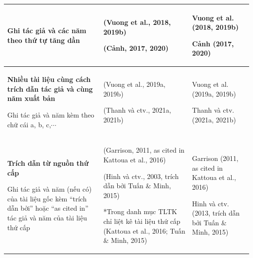 \documentclass[a4paper,oneside]{../../styles/thesis}
\begin{document}
\begin{table}
\begin{tabular}{|l|l|l|}
Ghi tác giả và các năm theo thứ tự tăng dần
    & (Vuong et al., 2018, 2019b)

(Cảnh, 2017, 2020)
 & Vuong et al. (2018, 2019b)

Cảnh (2017, 2020)
 \\
         \hline
  \textbf{Nhiều tài liệu cùng cách trích dẫn tác giả và cùng năm xuất bản}
  
Ghi tác giả và năm kèm theo chữ cái a, b, c,$\cdots$ & (Vuong et al., 2019a, 2019b)

(Thanh và ctv., 2021a, 2021b)
 & Vuong et al. (2019a, 2019b)

Thanh và ctv. (2021a, 2021b)
\\
         \hline
      \textbf{Trích dẫn từ nguồn thứ cấp}
      
Ghi tác giả và năm (nếu có) của tài liệu gốc kèm “trích dẫn bởi” hoặc “as cited in” tác giả và năm của tài liệu thứ cấp
   & (Garrison, 2011, as cited in Kattoua et al., 2016)

(Hinh và ctv., 2003, trích dẫn bởi Tuấn $\&$ Minh, 2015)

*Trong danh mục TLTK chỉ liệt kê tài liệu thứ cấp (Kattoua et al., 2016; Tuấn $\&$ Minh, 2015)
 & Garrison (2011, as cited in Kattoua et al., 2016) 

Hinh và ctv. (2013, trích dẫn bởi Tuấn $\&$ Minh, 2015)
\\
        \hline
  \end{tabular}
\end{table}
\end{document}
